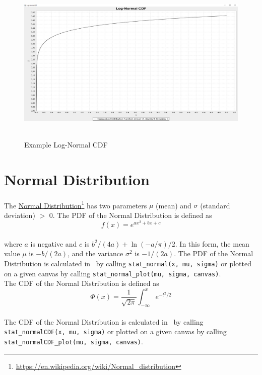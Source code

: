 		\begin{figure}[H]
			\centering
			\includegraphics[width=1\textwidth]{Figures/implemented_functions/log_normal_cdf}~\\
			\caption{Example Log-Normal CDF}
			\label{fig:log_normal_cdf}
		\end{figure}


	\section{Normal Distribution}
	
		The \href{https://en.wikipedia.org/wiki/Normal_distribution}{Normal Distribution}\footnote{\url{https://en.wikipedia.org/wiki/Normal_distribution}} has two parameters $\mu$ (mean) and $\sigma$ (standard deviation) $>$ 0. The \ac{PDF} of the Normal Distribution is defined as
		\\[0.3cm]
		$$f(x) = e^{a x^2 + b x + c}$$
		\\[0.3cm]
		where $a$ is negative and $c$ is $b^2/(4a)+\ln(-a/\pi)/2$. In this form, the mean value $\mu$ is $−b/(2a)$, and the variance $\sigma^2$ is $−1/(2a)$.
		The \ac{PDF} of the Normal Distribution is calculated in \setlx\ by calling \lstinline{stat_normal(x, mu, sigma)} or plotted on a given canvas by calling \lstinline{stat_normal_plot(mu, sigma, canvas)}.
		\\[0.3cm]
		The \ac{CDF} of the Normal Distribution is defined as
		\\[0.3cm]
		$$\Phi(x) = \frac 1 {\sqrt{2\pi}} \int_{-\infty}^x e^{-t^2/2}$$
		\\[0.3cm]
		The \ac{CDF} of the Normal Distribution is calculated in \setlx\ by calling \lstinline{stat_normalCDF(x, mu, sigma)} or plotted on a given canvas by calling \lstinline{stat_normalCDF_plot(mu, sigma, canvas)}.

